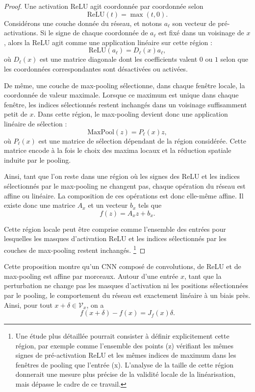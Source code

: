 \begin{proof}
Une activation ReLU agit coordonnée par coordonnée selon
\[
    \mathrm{ReLU}(t)=\max(t,0).
\]
Considérons une couche donnée du réseau, et notons $a_\ell$ son vecteur de pré-activations.
Si le signe de chaque coordonnée de $a_\ell$ est fixé dans un voisinage de $x$, alors la ReLU
agit comme une application linéaire sur cette région :
\[
    \mathrm{ReLU}(a_\ell)=D_\ell(x)a_\ell,
\]
où $D_\ell(x)$ est une matrice diagonale dont les coefficients valent $0$ ou $1$ selon que les
coordonnées correspondantes sont désactivées ou activées.

De même, une couche de max-pooling sélectionne, dans chaque fenêtre locale, la coordonnée
de valeur maximale. Lorsque ce maximum est unique dans chaque fenêtre, les indices sélectionnés
restent inchangés dans un voisinage suffisamment petit de $x$. Dans cette région, le max-pooling
devient donc une application linéaire de sélection :
\[
    \mathrm{MaxPool}(z)=P_\ell(x)z,
\]
où $P_\ell(x)$ est une matrice de sélection dépendant de la région considérée. Cette matrice
encode à la fois le choix des maxima locaux et la réduction spatiale induite par le pooling.

Ainsi, tant que l'on reste dans une région où les signes des ReLU et les indices sélectionnés
par le max-pooling ne changent pas, chaque opération du réseau est affine ou linéaire. La
composition de ces opérations est donc elle-même affine. Il existe donc une matrice $A_x$ et un
vecteur $b_x$ tels que
\[
    f(z)=A_xz+b_x.
\]

Cette région locale peut être comprise comme l'ensemble des entrées pour lesquelles les masques 
d'activation ReLU et les indices sélectionnés par les couches de max-pooling restent inchangés.
\footnote{Une étude plus détaillée pourrait consister à définir explicitement cette région, 
par exemple comme l'ensemble des points (z) vérifiant les mêmes signes de pré-activation 
ReLU et les mêmes indices de maximum dans les fenêtres de pooling que l'entrée (x). 
L'analyse de la taille de cette région donnerait une mesure plus précise de la validité 
locale de la linéarisation, mais dépasse le cadre de ce travail.}

\end{proof}

Cette proposition montre qu'un CNN composé de convolutions, de ReLU et de max-pooling est
affine par morceaux. Autour d'une entrée $x$, tant que la perturbation ne change pas les masques d'activation ni les positions sélectionnées
par le pooling, le comportement du réseau est exactement linéaire à un biais près. Ainsi, pour
tout $x+\delta\in\mathcal{V}_x$, on a
\[
    f(x+\delta)-f(x)=J_f(x)\delta.
\]

